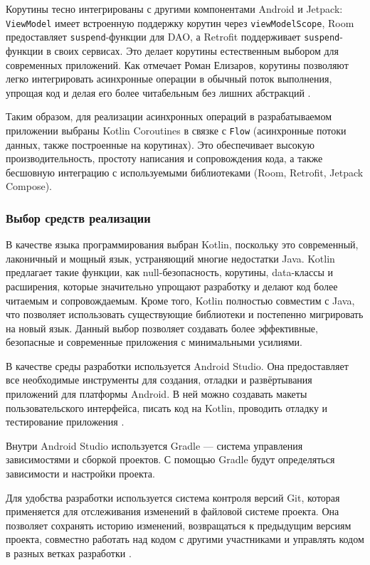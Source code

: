 Корутины тесно интегрированы с другими компонентами Android и Jetpack: \texttt{ViewModel} имеет встроенную поддержку корутин через \texttt{viewModelScope}, Room предоставляет \texttt{suspend}-функции для DAO, а Retrofit поддерживает \texttt{suspend}-функции в своих сервисах. Это делает корутины естественным выбором для современных приложений. Как отмечает Роман Елизаров, корутины позволяют легко интегрировать асинхронные операции в обычный поток выполнения, упрощая код и делая его более читабельным без лишних абстракций \cite{refn}.

Таким образом, для реализации асинхронных операций в разрабатываемом приложении выбраны Kotlin Coroutines в связке с \texttt{Flow} (асинхронные потоки данных, также построенные на корутинах). Это обеспечивает высокую производительность, простоту написания и сопровождения кода, а также бесшовную интеграцию с используемыми библиотеками (Room, Retrofit, Jetpack Compose).

\subsubsection{Выбор средств реализации}

В качестве языка программирования выбран Kotlin, поскольку это современный, лаконичный и мощный язык, устраняющий многие недостатки Java. Kotlin предлагает такие функции, как null-безопасность, корутины, data-классы и расширения, которые значительно упрощают разработку и делают код более читаемым и сопровождаемым. Кроме того, Kotlin полностью совместим с Java, что позволяет использовать существующие библиотеки и постепенно мигрировать на новый язык. Данный выбор позволяет создавать более эффективные, безопасные и современные приложения с минимальными усилиями.

В качестве среды разработки используется Android Studio. Она предоставляет все необходимые инструменты для создания, отладки и развёртывания приложений для платформы Android. В ней можно создавать макеты пользовательского интерфейса, писать код на Kotlin, проводить отладку и тестирование приложения \cite{refg}.

Внутри Android Studio используется Gradle — система управления зависимостями и сборкой проектов. С помощью Gradle будут определяться зависимости и настройки проекта.

Для удобства разработки используется система контроля версий Git, которая применяется для отслеживания изменений в файловой системе проекта. Она позволяет сохранять историю изменений, возвращаться к предыдущим версиям проекта, совместно работать над кодом с другими участниками и управлять кодом в разных ветках разработки \cite{refg}.

